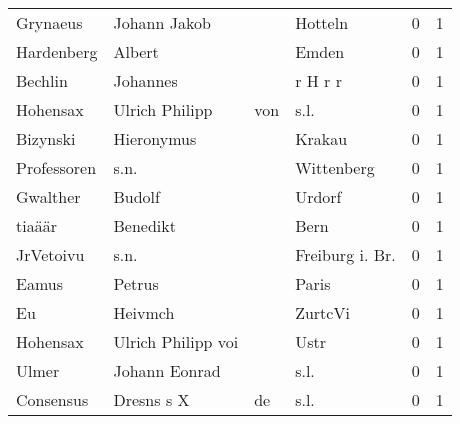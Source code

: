 \begin{center}
\begin{tiny}
\begin{longtabu}{llllrr}
                 Grynaeus &                       Johann Jakob &             &                                     Hotteln &          0 &         1 \\
               Hardenberg &                             Albert &             &                                       Emden &          0 &         1 \\
                  Bechlin &                           Johannes &             &                                     r H r r &          0 &         1 \\
                 Hohensax &                     Ulrich Philipp &         von &                                        s.l. &          0 &         1 \\
                 Bizynski &                         Hieronymus &             &                                      Krakau &          0 &         1 \\
              Professoren &                               s.n. &             &                                  Wittenberg &          0 &         1 \\
                 Gwalther &                             Budolf &             &                                      Urdorf &          0 &         1 \\
                   tiaäär &                           Benedikt &             &                                        Bern &          0 &         1 \\
                JrVetoivu &                               s.n. &             &                            Freiburg i. Br.  &          0 &         1 \\
                    Eamus &                             Petrus &             &                                       Paris &          0 &         1 \\
                       Eu &                            Heivmch &             &                                     ZurtcVi &          0 &         1 \\
                 Hohensax &                 Ulrich Philipp voi &             &                                        Ustr &          0 &         1 \\
                    Ulmer &                      Johann Eonrad &             &                                        s.l. &          0 &         1 \\
                Consensus &                         Dresns s X &          de &                                        s.l. &          0 &         1 \\

\end{longtabu}
\end{tiny}
\end{center}
